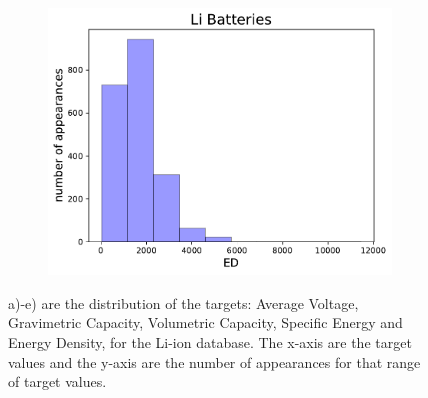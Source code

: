 \begin{figure}[h]
\begin{subfigure}{0.3\textwidth}
         \centering
         \includegraphics[width=\linewidth]{result/figures/columnsplotLi_ED.pdf}
         \caption{}
     \end{subfigure}
     \caption{a)-e) are the distribution of the targets: Average Voltage, Gravimetric Capacity, Volumetric Capacity, Specific Energy and Energy Density, for the Li-ion database. The x-axis are the target values and the y-axis are the number of appearances for that range of target values.}
     \label{fig:Li_targets_a-e}
 \end{figure}



\FloatBarrier
